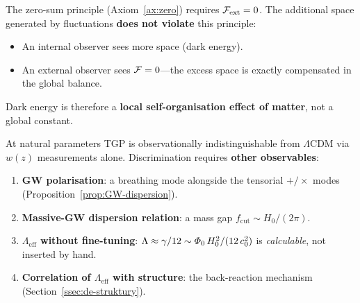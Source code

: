 The zero-sum principle (Axiom~\ref{ax:zero}) requires
$\mathcal{F}_{\mathrm{ext}} = 0$.  The additional space generated
by fluctuations \textbf{does not violate} this principle:
\begin{itemize}[nosep]
  \item An internal observer sees more space (dark energy).
  \item An external observer sees $\mathcal{F} = 0$---the excess
        space is exactly compensated in the global balance.
\end{itemize}
Dark energy is therefore a \textbf{local self-organisation
effect of matter}, not a global constant.

\begin{remark}%
\label{rem:rozroznienie}
At natural parameters TGP is observationally indistinguishable
from $\Lambda$CDM via $w(z)$ measurements alone.
Discrimination requires \textbf{other observables}:
\begin{enumerate}[nosep]
  \item \textbf{GW polarisation}: a breathing mode alongside
        the tensorial $+/\times$ modes
        (Proposition~\ref{prop:GW-dispersion}).
  \item \textbf{Massive-GW dispersion relation}:
        a mass gap $f_{\mathrm{cut}} \sim H_0/(2\pi)$.
  \item \textbf{$\Lambda_{\mathrm{eff}}$ without fine-tuning}:
        $\Lambda \approx \gamma/12
        \sim \varPhi_0\,H_0^2/(12\,c_0^2)$
        is \emph{calculable}, not inserted by hand.
  \item \textbf{Correlation of $\Lambda_{\mathrm{eff}}$
        with structure}: the back-reaction mechanism
        (Section~\ref{ssec:de-struktury}).
\end{enumerate}
\end{remark}
